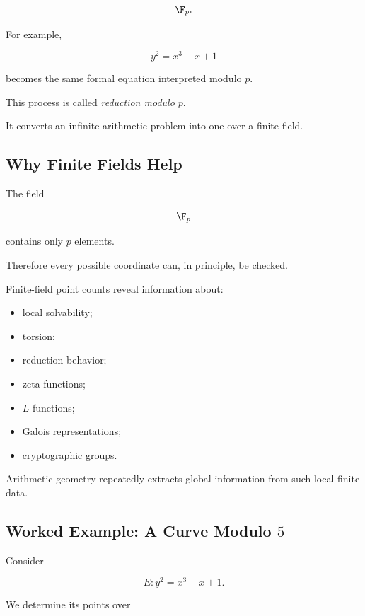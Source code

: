 \[ \F_p. \]

For example,

\[ y^2=x^3-x+1 \]

becomes the same formal equation interpreted modulo \(p\).

This process is called \emph{reduction modulo \(p\)}.

It converts an infinite arithmetic problem into one over a finite field.

\subsection{Why Finite Fields Help}
\label{subsec:why-finite-fields-help-arithmetic-geometry}

The field

\[ \F_p \]

contains only \(p\) elements.

Therefore every possible coordinate can, in principle, be checked.

Finite-field point counts reveal information about:

\begin{itemize}
    \item local solvability;
    \item torsion;
    \item reduction behavior;
    \item zeta functions;
    \item \(L\)-functions;
    \item Galois representations;
    \item cryptographic groups.
\end{itemize}

Arithmetic geometry repeatedly extracts global information from such local
finite data.

\subsection{Worked Example: A Curve Modulo \(5\)}
\label{subsec:worked-curve-mod-five}

Consider

\[ E:y^2=x^3-x+1. \]

We determine its points over

